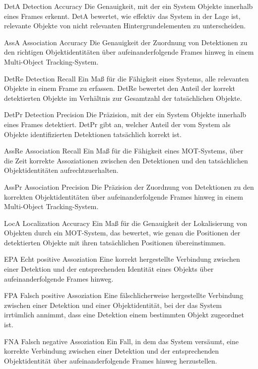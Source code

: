 \newglossaryentrywithacronym
{DetA}
{Detection Accuracy}
{Die Genauigkeit, mit der ein System Objekte innerhalb eines Frames erkennt. DetA bewertet, wie effektiv das System in der Lage ist, relevante Objekte von nicht relevanten Hintergrundelementen zu unterscheiden.}

\newglossaryentrywithacronym
{AssA}
{Association Accuracy}
{Die Genauigkeit der Zuordnung von Detektionen zu den richtigen Objektidentitäten über aufeinanderfolgende Frames hinweg in einem Multi-Object Tracking-System.}

\newglossaryentrywithacronym
{DetRe}
{Detection Recall}
{Ein Maß für die Fähigkeit eines Systems, alle relevanten Objekte in einem Frame zu erfassen. DetRe bewertet den Anteil der korrekt detektierten Objekte im Verhältnis zur Gesamtzahl der tatsächlichen Objekte.}

\newglossaryentrywithacronym
{DetPr}
{Detection Precision}
{Die Präzision, mit der ein System Objekte innerhalb eines Frames detektiert. DetPr gibt an, welcher Anteil der vom System als Objekte identifizierten Detektionen tatsächlich korrekt ist.}

\newglossaryentrywithacronym
{AssRe}
{Association Recall}
{Ein Maß für die Fähigkeit eines MOT-Systems, über die Zeit korrekte Assoziationen zwischen den Detektionen und den tatsächlichen Objektidentitäten aufrechtzuerhalten.}

\newglossaryentrywithacronym
{AssPr}
{Association Precision}
{Die Präzision der Zuordnung von Detektionen zu den korrekten Objektidentitäten über aufeinanderfolgende Frames hinweg in einem Multi-Object Tracking-System.}

\newglossaryentrywithacronym
{LocA}
{Localization Accuracy}
{Ein Maß für die Genauigkeit der Lokalisierung von Objekten durch ein MOT-System, das bewertet, wie genau die Positionen der detektierten Objekte mit ihren tatsächlichen Positionen übereinstimmen.}

\newglossaryentrywithacronym
{EPA}
{Echt positive Assoziation}
{Eine korrekt hergestellte Verbindung zwischen einer Detektion und der entsprechenden Identität eines Objekts über aufeinanderfolgende Frames hinweg.}

\newglossaryentrywithacronym
{FPA}
{Falsch positive Assoziation}
{Eine fälschlicherweise hergestellte Verbindung zwischen einer Detektion und einer Objektidentität, bei der das System irrtümlich annimmt, dass eine Detektion einem bestimmten Objekt zugeordnet ist.}

\newglossaryentrywithacronym
{FNA}
{Falsch negative Assoziation}
{Ein Fall, in dem das System versäumt, eine korrekte Verbindung zwischen einer Detektion und der entsprechenden Objektidentität über aufeinanderfolgende Frames hinweg herzustellen.}

